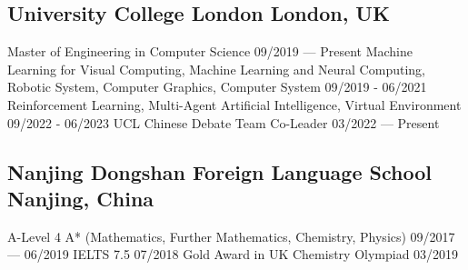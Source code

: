 
\subsection{University College London \hfill London, UK}
    Master of Engineering in Computer Science 
        \hfill 09/2019 --- Present 
    \newline
    Machine Learning for Visual Computing,
    Machine Learning and Neural Computing,
    \newline
    Robotic System, 
    Computer Graphics,
    Computer System
    \hfill 09/2019 - 06/2021
    \newline
    Reinforcement Learning, 
    Multi-Agent Artificial Intelligence,
    Virtual Environment
    \hfill 09/2022 - 06/2023
    \newline
    UCL Chinese Debate Team Co-Leader
        \hfill 03/2022 --- Present


\vspace{0.3em}


\subsection{Nanjing Dongshan Foreign Language School \hfill Nanjing, China}
    A-Level 4 A* (Mathematics, Further Mathematics, Chemistry, Physics) 
        \hfill 09/2017 --- 06/2019 
    \newline
    IELTS 7.5 
        \hfill 07/2018 
    \newline
    Gold Award in UK Chemistry Olympiad
        \hfill 03/2019


